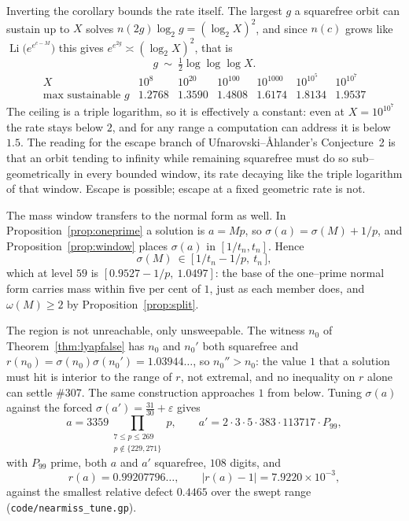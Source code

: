 \documentclass[11pt]{article}
\theoremstyle{definition}
\begin{document}
Inverting the corollary bounds the rate itself. The largest $g$ a squarefree orbit can sustain up to
$X$ solves $n(2g)\log_2g=(\log_2X)^2$, and since $n(c)$ grows like
$\operatorname{Li}\bigl(e^{e^{c-M}}\bigr)$ this gives $e^{e^{2g}}\asymp(\log_2X)^2$, that is
\[ g\ \sim\ \tfrac12\log\log\log X . \]
\[
\begin{array}{l|cccccc}
X & 10^{8} & 10^{20} & 10^{100} & 10^{1000} & 10^{10^{5}} & 10^{10^{7}}\\\hline
\text{max sustainable }g & 1.2768 & 1.3590 & 1.4808 & 1.6174 & 1.8134 & 1.9537
\end{array}
\]
The ceiling is a triple logarithm, so it is effectively a constant: even at $X=10^{10^{7}}$ the rate
stays below $2$, and for any range a computation can address it is below $1.5$. The reading for the
escape branch of Ufnarovski--\AA hlander's Conjecture~2 is that an orbit tending to infinity while
remaining squarefree must do so sub--geometrically in every bounded window, its rate decaying like
the triple logarithm of that window. Escape is possible; escape at a fixed geometric rate is not.

The mass window transfers to the normal form as well. In Proposition~\ref{prop:oneprime} a solution
is $a=Mp$, so $\sigma(a)=\sigma(M)+1/p$, and Proposition~\ref{prop:window} places $\sigma(a)$ in
$[1/t_n,t_n]$. Hence
\[ \sigma(M)\ \in\ \bigl[\,1/t_n-1/p,\ t_n\,\bigr], \]
which at level $59$ is $[0.9527-1/p,\ 1.0497]$: the base of the one--prime normal form carries mass
within five per cent of $1$, just as each member does, and $\omega(M)\ge2$ by
Proposition~\ref{prop:split}.

The region is not unreachable, only unsweepable. The witness $n_0$ of
Theorem~\ref{thm:lyapfalse} has $n_0$ and $n_0'$ both squarefree and
$r(n_0)=\sigma(n_0)\sigma(n_0')=1.03944\ldots$, so $n_0''>n_0$: the value $1$ that a solution must
hit is interior to the range of $r$, not extremal, and no inequality on $r$ alone can settle \#307.
The same construction approaches $1$ from below. Tuning $\sigma(a)$ against the forced
$\sigma(a')=\tfrac{31}{30}+\varepsilon$ gives
\[ a=3359\!\!\prod_{\substack{7\le p\le269\\p\notin\{229,271\}}}\!\!p,\qquad
   a'=2\cdot3\cdot5\cdot383\cdot113717\cdot P_{99}, \]
with $P_{99}$ prime, both $a$ and $a'$ squarefree, $108$ digits, and
\[ r(a)=0.99207796\ldots,\qquad |r(a)-1|=7.9220\times10^{-3}, \]
against the smallest relative defect $0.4465$ over the swept range
\textup{(\texttt{code/nearmiss\_tune.gp})}.
\end{document}
